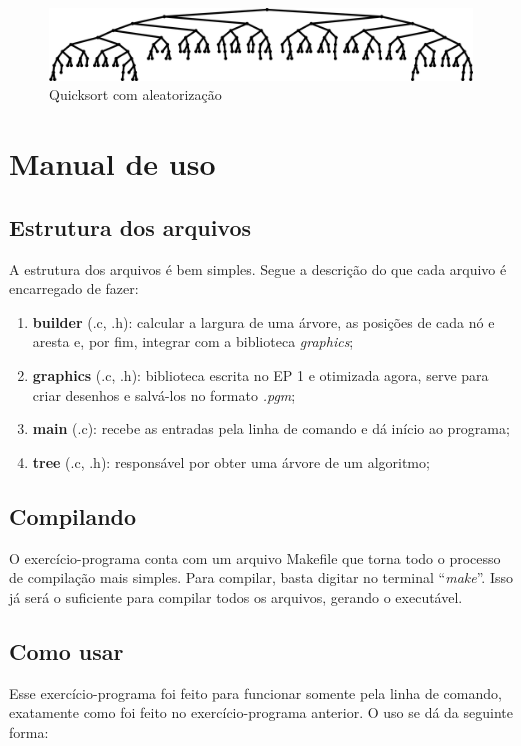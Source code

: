 \documentclass[12pt,a4paper]{article}
\begin{document}
	\begin{figure}[h!]
		\vspace*{0.3in}
		\centering
		\includegraphics[width=\textwidth]{quicksort_random.png}
		\caption{Quicksort com aleatorização}
	\end{figure}




	\section{Manual de uso}

	\subsection{Estrutura dos arquivos}
	\indent A estrutura dos arquivos é bem simples. Segue a descrição do que cada arquivo é encarregado de fazer:
	\begin{enumerate}
	\item \textbf{builder} (.c, .h): calcular a largura de uma árvore, as posições de cada nó e aresta e, por fim, integrar com a biblioteca \textit{graphics};
	\item \textbf{graphics} (.c, .h): biblioteca escrita no EP 1 e otimizada agora, serve para criar desenhos e salvá-los no formato \textit{.pgm};
	\item \textbf{main} (.c): recebe as entradas pela linha de comando e dá início ao programa;
	\item \textbf{tree} (.c, .h): responsável por obter uma árvore de um algoritmo;
	\end{enumerate}

	\subsection{Compilando}
	\indent O exercício-programa conta com um arquivo Makefile que torna todo o processo de compilação mais simples. Para compilar, basta digitar no terminal “\textit{make}”. Isso já será o suficiente para compilar todos os arquivos, gerando o executável.\\

	\subsection{Como usar}
	\indent Esse exercício-programa foi feito para funcionar somente pela linha de comando, exatamente como foi feito no exercício-programa anterior. O uso se dá da seguinte forma:\\
\end{document}

